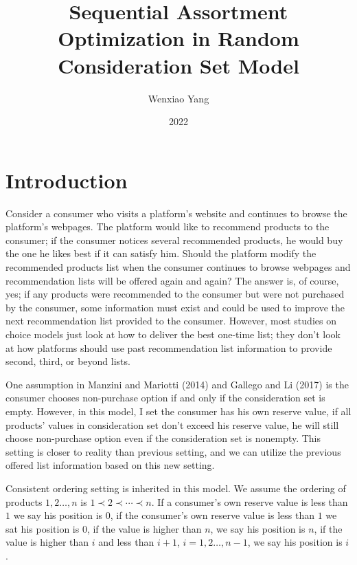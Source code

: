 \documentclass[11pt,a4paper]{article}
\title{Sequential Assortment Optimization in Random Consideration Set Model}
\author[*]{Wenxiao Yang}
\affil[*]{Department of Mathematics, University of Illinois at Urbana-Champaign}
\date{2022}
\begin{document}
\maketitle


\section{Introduction}

Consider a consumer who visits a platform's website and continues to browse the platform's webpages. The platform would like to recommend products to the consumer; if the consumer notices several recommended products, he would buy the one he likes best if it can satisfy him. Should the platform modify the recommended products list when the consumer continues to browse webpages and recommendation lists will be offered again and again? The answer is, of course, yes; if any products were recommended to the consumer but were not purchased by the consumer, some information must exist and could be used to improve the next recommendation list provided to the consumer. However, most studies on choice models just look at how to deliver the best one-time list; they don't look at how platforms should use past recommendation list information to provide second, third, or beyond lists.

One assumption in Manzini and Mariotti (2014) and Gallego and Li (2017) is the consumer chooses non-purchase option if and only if the consideration set is empty. However, in this model, I set the consumer has his own reserve value, if all products’ values in consideration set don’t exceed his reserve value, he will still choose non-purchase option even if the consideration set is nonempty. This setting is closer to reality than previous setting, and we can utilize the previous offered list information based on this new setting.

Consistent ordering setting is inherited in this model. We assume the ordering of products $1,2…,n$ is $1\prec 2\prec \cdots \prec n$. If a consumer’s own reserve value is less than $1$ we say his position is $0$, if the consumer’s own reserve value is less than $1$ we sat his position is $0$, if the value is higher than $n$, we say his position is $n$, if the value is higher than $i$ and less than $i+1$, $i=1,2…,n-1$, we say his position is $i$.
\end{document}
